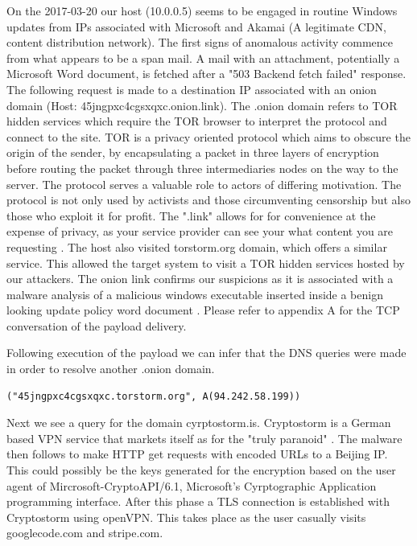 \documentclass[11pt]{diazessay} %
\begin{document}
On the 2017-03-20 our host (10.0.0.5) seems to be engaged in routine Windows updates from IPs associated with Microsoft and Akamai (A legitimate CDN, content distribution network). The first signs of anomalous activity commence from what appears to be a span mail. A mail with an attachment, potentially a Microsoft Word document, is fetched after a "503 Backend fetch failed" response. The following request is made to a destination IP associated with an onion domain (Host: 45jngpxc4cgsxqxc.onion.link). The .onion domain refers to TOR hidden services which require the TOR browser to interpret the protocol and connect to the site. TOR is a privacy oriented protocol which aims to obscure the origin of the sender, by encapsulating a packet in three layers of encryption before routing the packet through three intermediaries nodes on the way to the server. The protocol serves a valuable role to actors of differing motivation. The protocol is not only used by activists and those circumventing censorship but also those who exploit it for profit. The ".link" allows for for convenience at the expense of privacy, as your service provider can see your what content you are requesting \cite{onionlink}. The host also visited  torstorm.org domain, which offers a similar service. This allowed the target system to visit a TOR hidden services hosted by our attackers. The onion link confirms our suspicions as it is associated with a malware analysis of a malicious windows executable inserted inside a benign looking update policy word document \cite{hybrid}. Please refer to appendix A for the TCP conversation of the payload delivery.

Following execution of the payload we can infer that the DNS queries were made in order to resolve another .onion domain.

\begin{lstlisting}[language=html]
("45jngpxc4cgsxqxc.torstorm.org", A(94.242.58.199))
\end{lstlisting}

Next we see a query for the domain cyrptostorm.is. Cryptostorm is a German based VPN service that markets itself as for the "truly paranoid" \cite{cryptostorm}. The malware then follows to make HTTP get requests with encoded URLs to a Beijing IP. This could possibly be the keys generated for the encryption based on the user agent of Mircrosoft-CryptoAPI/6.1, Microsoft's Cyrptographic Application programming interface. After this phase a TLS connection is established with Cryptostorm using openVPN. This takes place as the user casually visits googlecode.com and stripe.com. 
\end{document}
